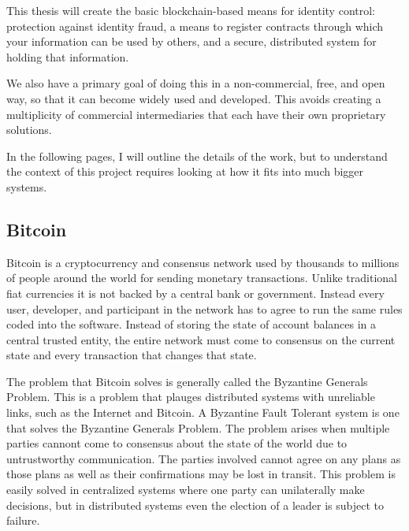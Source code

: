 \documentclass[a4paper]{article}
\begin{document}
This thesis will create the basic blockchain-based means for identity control: protection against identity fraud, a means to register contracts through which your information can be used by others, and a secure, distributed system for holding that information.

We also have a primary goal of doing this in a non-commercial, free, and open way, so that it can become widely used and developed.  This avoids creating a multiplicity of commercial intermediaries that each have their own proprietary solutions.

In the following pages, I will outline the details of the work, but to understand the context of this project requires looking at how it fits into much bigger systems.

\subsection{Bitcoin}

Bitcoin is a cryptocurrency and consensus network used by thousands to millions of people around the world for sending monetary transactions. Unlike traditional fiat currencies it is not backed by a central bank or government. Instead every user, developer, and participant in the network has to agree to run the same rules coded into the software. Instead of storing the state of account balances in a central trusted entity, the entire network must come to consensus on the current state and every transaction that changes that state.

The problem that Bitcoin solves is generally called the Byzantine Generals Problem. This is a problem that plauges distributed systems with unreliable links, such as the Internet and Bitcoin. A Byzantine Fault Tolerant system is one that solves the Byzantine Generals Problem. The problem arises when multiple parties cannont come to consensus about the state of the world due to untrustworthy communication. The parties involved cannot agree on any plans as those plans as well as their confirmations may be lost in transit. This problem is easily solved in centralized systems where one party can unilaterally make decisions, but in distributed systems even the election of a leader is subject to failure.
\end{document}
